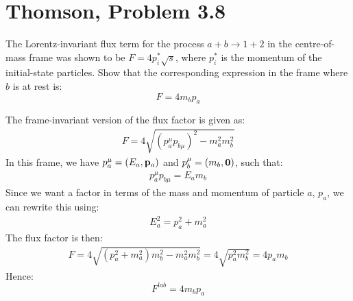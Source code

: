 \documentclass[12pt]{article}
\begin{document}
\section{Thomson, Problem 3.8}
\begin{problem}
  The Lorentz-invariant flux term for the process $a+b\to1+2$ in the centre-of-mass frame was shown to be $F=4p_i^*\sqrt{s}$, where $p_i^*$ is the momentum of the initial-state particles. Show that the corresponding expression in the frame where $b$ is at rest is:
  \begin{equation*}
    F=4m_bp_a
  \end{equation*}
\end{problem}
The frame-invariant version of the flux factor is given as:
\begin{align*}
  F=4\sqrt{(p_a^\mu p_{b\mu})^2-m_a^2m_b^2}
\end{align*}
In this frame, we have $p^\mu_a=(E_a,\vb{p}_a)$ and $p^\mu_b=(m_b,\vb{0})$, such that:
\begin{align*}
  p_a^\mu p_{b\mu}=E_am_b
\end{align*}
Since we want a factor in terms of the mass and momentum of particle $a$, $p_a$, we can rewrite this using:
\begin{align*}
  E_a^2=p_a^2+m_a^2
\end{align*}
The flux factor is then:
\begin{align*}
  F=4\sqrt{(p_a^2+m_a^2)m_b^2-m_a^2m_b^2}
  =4\sqrt{p_a^2m_b^2}=4p_am_b
\end{align*}
Hence:
\begin{equation}
  \label{eq:p4}
  \boxed{F^{lab}=4m_bp_a}
\end{equation}
\newpage
\end{document}
